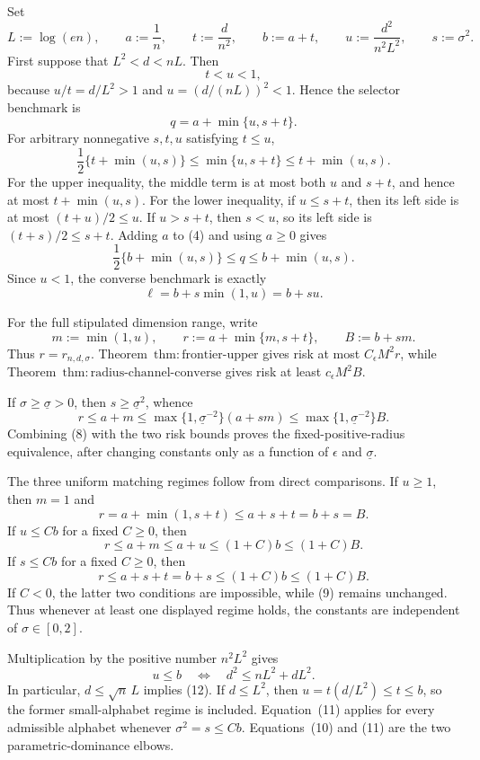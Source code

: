 Set
\[
 L:=\log(en),\qquad a:=\frac1n,\qquad t:=\frac d{n^2},
 \qquad b:=a+t,\qquad u:=\frac{d^2}{n^2L^2},
 \qquad s:=\sigma^2.
\tag{1}
\]
First suppose that \(L^2<d<nL\).  Then
\[
 t<u<1,
\tag{2}
\]
because \(u/t=d/L^2>1\) and \(u=(d/(nL))^2<1\).  Hence the selector benchmark is
\[
 q=a+\min\{u,s+t\}.
\tag{3}
\]
For arbitrary nonnegative \(s,t,u\) satisfying \(t\le u\),
\[
 \frac12\{t+\min(u,s)\}
 \le \min\{u,s+t\}
 \le t+\min(u,s).
\tag{4}
\]
For the upper inequality, the middle term is at most both \(u\) and \(s+t\), and hence at most \(t+\min(u,s)\).  For the lower inequality, if \(u\le s+t\), then its left side is at most \((t+u)/2\le u\).  If \(u>s+t\), then \(s<u\), so its left side is \((t+s)/2\le s+t\).  Adding \(a\) to (4) and using \(a\ge0\) gives
\[
 \frac12\{b+\min(u,s)\}
 \le q\le b+\min(u,s).
\tag{5}
\]
Since \(u<1\), the converse benchmark is exactly
\[
 \ell=b+s\min(1,u)=b+su.
\tag{6}
\]

For the full stipulated dimension range, write
\[
 m:=\min(1,u),\qquad
 r:=a+\min\{m,s+t\},\qquad
 B:=b+sm.
\tag{7}
\]
Thus \(r=r_{n,d,\sigma}\).  Theorem~\(\mathrm{thm:frontier\text{-}upper}\) gives risk at most \(C_\epsilon M^2r\), while Theorem~\(\mathrm{thm:radius\text{-}channel\text{-}converse}\) gives risk at least \(c_\epsilon M^2B\).

If \(\sigma\ge\underline\sigma>0\), then \(s\ge\underline\sigma^2\), whence
\[
 r\le a+m
 \le \max\{1,\underline\sigma^{-2}\}(a+sm)
 \le \max\{1,\underline\sigma^{-2}\}B.
\tag{8}
\]
Combining (8) with the two risk bounds proves the fixed-positive-radius equivalence, after changing constants only as a function of \(\epsilon\) and \(\underline\sigma\).

The three uniform matching regimes follow from direct comparisons.  If \(u\ge1\), then \(m=1\) and
\[
 r=a+\min(1,s+t)\le a+s+t=b+s=B.
\tag{9}
\]
If \(u\le Cb\) for a fixed \(C\ge0\), then
\[
 r\le a+m\le a+u\le(1+C)b\le(1+C)B.
\tag{10}
\]
If \(s\le Cb\) for a fixed \(C\ge0\), then
\[
 r\le a+s+t=b+s\le(1+C)b\le(1+C)B.
\tag{11}
\]
If \(C<0\), the latter two conditions are impossible, while (9) remains unchanged.  Thus whenever at least one displayed regime holds, the constants are independent of \(\sigma\in[0,2]\).

Multiplication by the positive number \(n^2L^2\) gives
\[
 u\le b
 \quad\Longleftrightarrow\quad
 d^2\le nL^2+dL^2.
\tag{12}
\]
In particular, \(d\le\sqrt n\,L\) implies (12).  If \(d\le L^2\), then \(u=t(d/L^2)\le t\le b\), so the former small-alphabet regime is included.  Equation~(11) applies for every admissible alphabet whenever \(\sigma^2=s\le Cb\).  Equations~(10) and (11) are the two parametric-dominance elbows.


